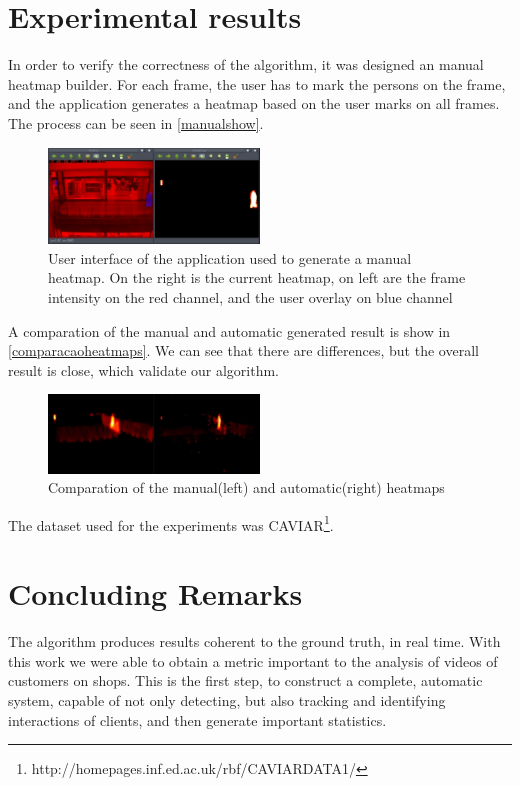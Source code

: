 \documentclass[10pt, conference]{IEEEtran}
\begin{document}
	\section{Experimental results}
	In order to verify the correctness of the algorithm, it was designed an manual heatmap builder. For each frame, the user has to mark the persons on the frame, and the application generates a heatmap based on the user marks on all frames. The process can be seen in \autoref{manualshow}.
	\begin{figure}[H]
		\centering
		\includegraphics[width=0.5\textwidth]{figs/manualshow}
		\caption{User interface of the application used to generate a manual heatmap. On the right is the current heatmap, on left are the frame intensity on the red channel, and the user overlay on blue channel}
		\label{manualshow}
	\end{figure}
	A comparation of the manual and automatic generated result is show in \autoref{comparacaoheatmaps}. We can see that there are differences, but the overall result is close, which validate our algorithm.
	\begin{figure}[H]
		\centering
		\includegraphics[width=0.5\textwidth]{figs/comparacaoheatmaps}
		\caption{Comparation of the manual(left) and automatic(right) heatmaps}
		\label{comparacaoheatmaps}
	\end{figure}
	The dataset used for the experiments was CAVIAR\footnote{http://homepages.inf.ed.ac.uk/rbf/CAVIARDATA1/}.
	
	
	\section{Concluding Remarks}
	The algorithm produces results coherent to the ground truth, in real time. With this work we were able to obtain a metric important to the analysis of videos of customers on shops. This is the first step, to construct a complete, automatic system, capable of not only detecting, but also tracking and identifying interactions of clients, and then generate important statistics.
	
\end{document}

